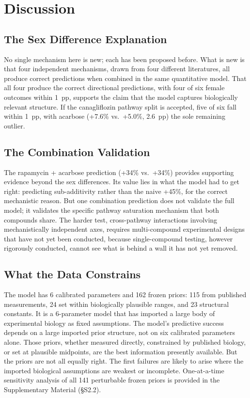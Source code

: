 \documentclass[11pt]{article}
\begin{document}
\section{Discussion}

\subsection{The Sex Difference Explanation}

No single mechanism here is new; each has been proposed before. What is new is that four independent mechanisms, drawn from four different literatures, all produce correct predictions when combined in the same quantitative model. That all four produce the correct directional predictions, with four of six female outcomes within 1~pp, supports the claim that the model captures biologically relevant structure. If the canagliflozin pathway split is accepted, five of six fall within 1~pp, with acarbose (+7.6\% vs.\ +5.0\%, 2.6~pp) the sole remaining outlier.

\subsection{The Combination Validation}

The rapamycin + acarbose prediction (+34\% vs.\ +34\%) provides supporting evidence beyond the sex differences. Its value lies in what the model had to get right: predicting sub-additivity rather than the naive +45\%, for the correct mechanistic reason. But one combination prediction does not validate the full model; it validates the specific pathway saturation mechanism that both compounds share. The harder test, cross-pathway interactions involving mechanistically independent axes, requires multi-compound experimental designs that have not yet been conducted, because single-compound testing, however rigorously conducted, cannot see what is behind a wall it has not yet removed.

\subsection{What the Data Constrains}

The model has 6 calibrated parameters and 162 frozen priors: 115 from published measurements, 24 set within biologically plausible ranges, and 23 structural constants. It is a 6-parameter model that has imported a large body of experimental biology as fixed assumptions. The model's predictive success depends on a large imported prior structure, not on six calibrated parameters alone. Those priors, whether measured directly, constrained by published biology, or set at plausible midpoints, are the best information presently available. But the priors are not all equally right. The first failures are likely to arise where the imported biological assumptions are weakest or incomplete. One-at-a-time sensitivity analysis of all 141 perturbable frozen priors is provided in the Supplementary Material (\S S2.2).
\end{document}

